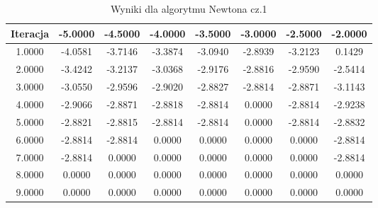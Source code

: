 \documentclass[a4paper, 11pt]{article}
\begin{document}
\begin{enumerate}
\begin{itemize}
\begin{table}                                                                  
\centering                                                                     
\begin{tabular}{|c|c|c|c|c|c|c|c|}                                             
\hline                                                                         
Iteracja & -5.0000 & -4.5000 & -4.0000 & -3.5000 & -3.0000 & -2.5000 & -2.0000 \\
\hline                                                                         
1.0000 & -4.0581 & -3.7146 & -3.3874 & -3.0940 & -2.8939 & -3.2123 & 0.1429 \\ 
\hline                                                                         
2.0000 & -3.4242 & -3.2137 & -3.0368 & -2.9176 & -2.8816 & -2.9590 & -2.5414 \\
\hline                                                                         
3.0000 & -3.0550 & -2.9596 & -2.9020 & -2.8827 & -2.8814 & -2.8871 & -3.1143 \\
\hline                                                                         
4.0000 & -2.9066 & -2.8871 & -2.8818 & -2.8814 & 0.0000 & -2.8814 & -2.9238 \\ 
\hline                                                                         
5.0000 & -2.8821 & -2.8815 & -2.8814 & -2.8814 & 0.0000 & -2.8814 & -2.8832 \\ 
\hline                                                                         
6.0000 & -2.8814 & -2.8814 & 0.0000 & 0.0000 & 0.0000 & 0.0000 & -2.8814 \\    
\hline                                                                         
7.0000 & -2.8814 & 0.0000 & 0.0000 & 0.0000 & 0.0000 & 0.0000 & -2.8814 \\     
\hline                                                                         
8.0000 & 0.0000 & 0.0000 & 0.0000 & 0.0000 & 0.0000 & 0.0000 & 0.0000 \\       
\hline                                                                         
9.0000 & 0.0000 & 0.0000 & 0.0000 & 0.0000 & 0.0000 & 0.0000 & 0.0000 \\       
\hline                                                                         
\end{tabular}       
\caption{Wyniki dla algorytmu Newtona cz.1}                                                                                                                                                                                          

\end{table}
\end{itemize}
\end{enumerate}
\end{document}
